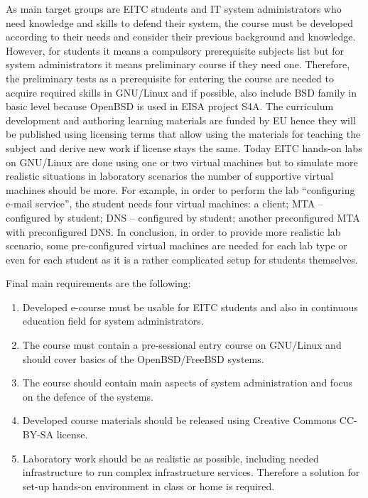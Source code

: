 As main target groups are \gls{EITC} students and IT system administrators who need knowledge and skills to defend their system, the course must be developed according to their needs and consider their previous background and knowledge. However, for students it means a compulsory prerequisite subjects list but for system administrators it means preliminary course if they need one. Therefore, the preliminary tests as  a prerequisite for entering the course are needed to acquire required skills in GNU/Linux and if possible, also include \gls{BSD} family in basic level because OpenBSD is used in \gls{EISA} project S4A.
The curriculum development and authoring learning materials are funded by EU hence they  will be published using licensing terms that allow using the materials for teaching the subject and derive new work if license stays the same.
{\color{red} Today EITC hands-on labs on GNU/Linux are done using one or two virtual machines but to simulate more realistic situations in laboratory scenarios the number of supportive virtual machines should be more. }
 For example, in order to perform the lab “configuring e-mail service”, the student needs four virtual machines: a client;  MTA -- configured by student; DNS -- configured by student; another preconfigured MTA with preconfigured DNS. In conclusion, in order to provide more realistic lab scenario, some pre-configured virtual machines are needed for each lab type or even for each student as it is a rather complicated setup for students themselves.
 
Final main requirements are the following:
\begin{enumerate}[label=Requirement \arabic*.,leftmargin=*]
  \item Developed e-course must be usable for \gls{EITC} students and also in continuous education field for system administrators.
  \item The course must contain a pre-sessional entry course on GNU/Linux and should cover basics  of the OpenBSD/FreeBSD systems.
  \item The course should contain main aspects of system administration and focus on the defence of the systems.
  \item Developed course materials should be released using Creative Commons \gls{CC-BY-SA} license.
  \item Laboratory work should be as realistic as possible, including needed infrastructure to run complex infrastructure services. Therefore a solution for set-up hands-on environment in class or home is required.
\end{enumerate}


